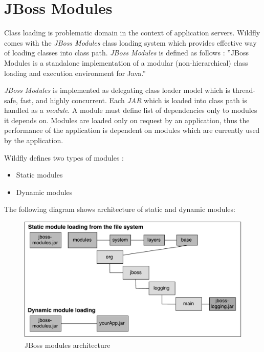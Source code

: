 \documentclass[12pt,oneside]{fithesis2}
\begin{document}
\section{JBoss Modules}
\label{jboss_modules_sec}
Class loading is problematic domain in the context of application servers. Wildfly comes with the \textit{JBoss Modules} class loading system which provides effective way of loading classes into class path. \textit{JBoss Modules} is defined as follows \cite[Introduction]{jboss_modules_doc}: ''JBoss Modules is a standalone implementation of a modular (non-hierarchical) class loading and execution environment for Java.''

\textit{JBoss Modules} is implemented as delegating class loader model which is thread-safe, fast, and highly concurrent. Each \textit{JAR} which is loaded into class path is handled as a \textit{module}. A module must define list of dependencies only to modules it depends on. Modules are loaded only on request by an application, thus the performance of the application is dependent on modules which are currently used by the application.

Wildfly defines two types of modules \cite{wildfly_book}:

\begin{itemize}
	\item Static modules
	\item Dynamic modules
\end{itemize}

The following diagram shows architecture of static and dynamic modules:

\begin{figure}[ht!]
	\centering
	\includegraphics[width=\textwidth]{images/jboss_modules}
	\caption{JBoss modules architecture \cite{wildfly_book}}
	\label{jboss_modules_image}
\end{figure}
\end{document}
